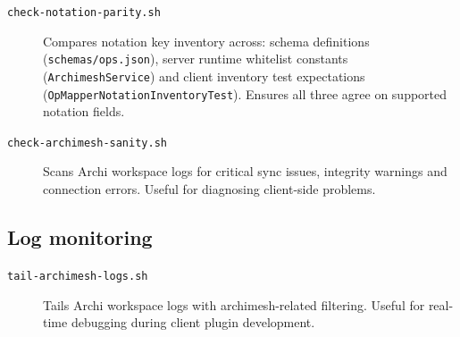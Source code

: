 \begin{description}
\item[\texttt{check-notation-parity.sh}]
  Compares notation key inventory across: schema definitions
  (\texttt{schemas/ops.json}), server runtime whitelist constants
  (\texttt{ArchimeshService}) and client inventory test expectations
  (\texttt{OpMapperNotationInventoryTest}). Ensures all three agree on
  supported notation fields.

\item[\texttt{check-archimesh-sanity.sh}]
  Scans Archi workspace logs for critical sync issues, integrity warnings
  and connection errors. Useful for diagnosing client-side problems.
\end{description}

\subsection{Log monitoring}

\begin{description}
\item[\texttt{tail-archimesh-logs.sh}]
  Tails Archi workspace logs with archimesh-related filtering. Useful for
  real-time debugging during client plugin development.
\end{description}
